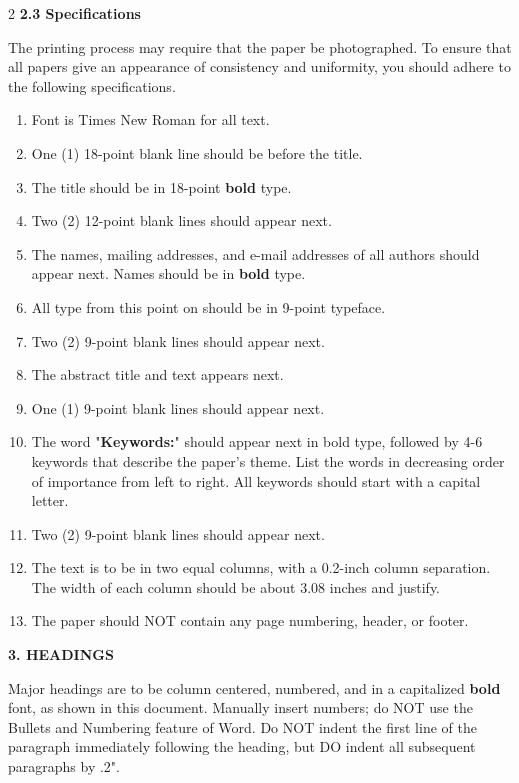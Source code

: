 \documentclass[9pt]{article}
\begin{document}
\begin{multicols}{2}
\textbf{2.3 Specifications}

The printing process may require that the paper be photographed. To ensure that
all papers give an appearance of consistency and uniformity, you should adhere to
the following specifications.

\begin{enumerate}
	\item Font is Times New Roman for all text.
	\item One (1) 18-point blank line should be before the title.
	\item The title should be in 18-point \textbf{bold} type.
	\item Two (2) 12-point blank lines should appear next.
	\item The names, mailing addresses, and e-mail addresses of all authors should appear
next. Names should be in\textbf{ bold }type.
	\item All type from this point on should be in 9-point typeface.
	\item Two (2) 9-point blank lines should appear next.
	\item The abstract title and text appears next.
	\item One (1) 9-point blank lines should appear next.
	\item The word "\textbf{Keywords:}" should appear next in bold type, followed by 4-6
keywords that describe the paper's theme. List the words in decreasing order of
importance from left to right. All keywords should start with a capital letter.
	\item Two (2) 9-point blank lines should appear next.
	\item The text is to be in two equal columns, with a 0.2-inch column separation. The
width of each column should be about 3.08 inches and justify.
	\item The paper should NOT contain any page numbering, header, or footer.
\end{enumerate}

\begin{center}
\textbf{3. HEADINGS}
\end{center}

Major headings are to be column centered, numbered, and in a capitalized
\textbf{bold} font, as shown in this document. Manually insert numbers; do NOT
use the Bullets and Numbering feature of Word. Do NOT indent the first line of
the paragraph immediately following the heading, but DO indent all subsequent
paragraphs by .2".


\end{multicols}
\end{document}
